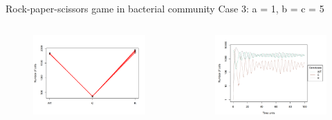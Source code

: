 \begin{frame}{Rock-paper-scissors game in bacterial community}
Case 3: a = 1,  b = c = 5
	\begin{columns}
		\begin{column}{0.5\textwidth}
			\begin{figure}
				\includegraphics[scale=0.35]{img/CRS_caso3_1.png}			
			\end{figure}
		\end{column}

		\begin{column}{0.5\textwidth}
			\begin{figure}
				\includegraphics[scale=0.35]{img/CRS_caso3_2.png}			
			\end{figure}
		\end{column}
	\end{columns}
\end{frame}

